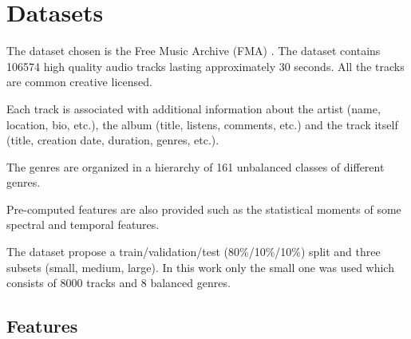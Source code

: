\section{Datasets}

The dataset chosen is the Free Music Archive (FMA) \cite{fma_dataset}.
The dataset contains 106574 high quality audio tracks lasting approximately 30 seconds. All the tracks are common creative licensed.

Each track is associated with additional information about the artist (name, location, bio, etc.), the album (title, listens, comments, etc.) and the track itself (title, creation date, duration, genres, etc.). 

The genres are organized in a hierarchy of 161 unbalanced classes of different genres.

Pre-computed features are also provided such as the statistical moments of some spectral and temporal features.

The dataset propose a train/validation/test (80\%/10\%/10\%) split and three subsets (small, medium, large).
In this work only the small one was used which consists of 8000 tracks and 8 balanced genres.

\subsection{Features}

